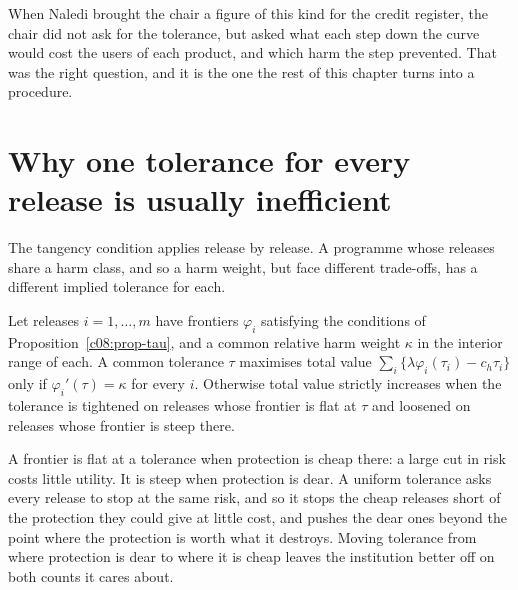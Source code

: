 \syntheticnote


When Naledi brought the chair a figure of this kind for the credit register, the
chair did not ask for the tolerance, but asked what each step
down the curve would cost the users of each product, and which harm the step
prevented. That was the right question, and it is the one the rest of this chapter
turns into a procedure.

\section{Why one tolerance for every release is usually inefficient}\label{c08:sec-uniform}

The tangency condition applies release by release. A programme whose releases share
a harm class, and so a harm weight, but face different trade-offs, has a different
implied tolerance for each.

\begin{corollary}\label{c08:cor-uniform}
Let releases $i = 1,\dots,m$ have frontiers $\varphi_i$ satisfying the conditions of
Proposition~\ref{c08:prop-tau}, and a common relative harm weight $\kappa$ in the
interior range of each. A common tolerance $\tau$ maximises total value
$\sum_i \{\lambda \varphi_i(\tau_i) - c_h \tau_i\}$ only if $\varphi_i'(\tau) =
\kappa$ for every $i$. Otherwise total value strictly increases when the tolerance
is tightened on releases whose frontier is flat at $\tau$ and loosened on releases
whose frontier is steep there.
\end{corollary}

A frontier is flat at a tolerance when protection is cheap there: a large cut in
risk costs little utility. It is steep when protection is dear. A uniform tolerance
asks every release to stop at the same risk, and so it stops the cheap releases
short of the protection they could give at little cost, and pushes the dear ones
beyond the point where the protection is worth what it destroys. Moving
tolerance from where protection is dear to where it is cheap leaves the institution
better off on both counts it cares about.

